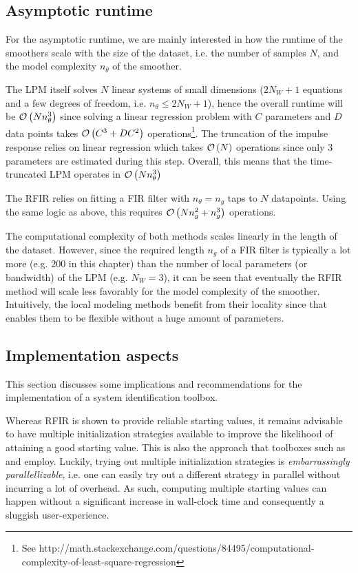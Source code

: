 \subsection{Asymptotic runtime}
For the asymptotic runtime, we are mainly interested in how the runtime of the smoothers scale with the size of the dataset, i.e. the number of samples $N$, and the model complexity $n_{\theta}$ of the smoother.


The \gls{LPM} itself solves $N$ linear systems of small dimensions ($2N_W + 1$ equations and a few degrees of freedom, i.e. $n_{\theta} \leq 2 N_W + 1$), hence the overall runtime will be $\mathcal{O} \left( N n_{\theta}^3 \right)$ since solving a linear regression problem with $C$ parameters and $D$ data points takes $\mathcal{O} \left( C^3  + D C^2 \right)$ operations\footnote{See http://math.stackexchange.com/questions/84495/computational-complexity-of-least-square-regression}.
The truncation of the impulse response relies on linear regression which takes $\mathcal{O} \left( N \right)$ operations since only $3$ parameters are estimated during this step.
Overall, this means that the time-truncated \gls{LPM} operates in $\mathcal{O} \left( N n_{\theta}^{3} \right)$

The \gls{RFIR} relies on fitting a \gls{FIR} filter with $n_{\theta} = n_g$ taps to $N$ datapoints.
Using the same logic as above, this requires $\mathcal{O} \left( N n_{g}^2 + n_g^3 \right)$ operations.

The computational complexity  of both methods scales linearly in the length of the dataset.
However, since the required length $n_g$ of a \gls{FIR} filter is typically a lot more (e.g. $200$ in this chapter) than the number of local parameters (or bandwidth) of the \gls{LPM} (e.g. $N_W = 3$), it can be seen that eventually the \gls{RFIR} method will scale less favorably for the model complexity of the smoother.
Intuitively, the local modeling methods benefit from their locality since that enables them to be flexible without a huge amount of parameters.

\subsection{Implementation aspects}
This section discusses some implications and recommendations for the implementation of  a system identification toolbox.

Whereas \gls{RFIR} is shown to provide reliable starting values, it remains advisable to have multiple initialization strategies available to improve the likelihood of attaining a good starting value.
This is also the approach that toolboxes such as \citep{FDIDENT} and \citep{TDIDENT} employ.
Luckily, trying out multiple initialization strategies is \emph{embarrassingly parallellizable}, i.e. one can easily try out a different strategy in parallel without incurring a lot of overhead.
As such, computing multiple starting values can happen without a significant increase in wall-clock time and consequently a sluggish user-experience.


